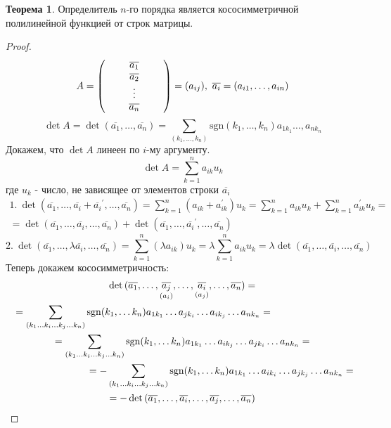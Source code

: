 \documentclass[a4paper, 12pt]{article}
\newcommand\tab[1][.5cm]{\hspace*{#1}}
\newcounter{thcount}
\theoremstyle{definition}
\newtheorem{theoremnum}[thcount]{Теорема}
\begin{document}
  \begin{theoremnum}
    Определитель $n$-го порядка является кососимметричной полилинейной функцией от строк матрицы.    
  \end{theoremnum} 
  \begin{proof}
    $$A=\begin{pmatrix}
      \tab & \overline{a_1} & \tab\\
      \null & \overline{a_2} & \null\\
      \null & \vdots & \null\\
      \null & \overline{a_n} & \null
    \end{pmatrix}=(a_{ij}),\ \overline{a_i}=(a_{i1},\dots, a_{in})$$
    $$\det{A}=\det{(\overline{a_1},\dots, \overline{a_n})}=\sum\limits_{(k_1,\dots, k_n)}\textrm{sgn}(k_1,\dots, k_n)a_{1k_1}\dots, a_{nk_n}$$
    Докажем, что $\det{A}$ линеен по $i$-му аргументу.
    $$\det{A}=\sum\limits_{k=1}^na_{ik}u_k$$
    где $u_k$ - число, не зависящее от элементов строки $\overline{a_i}$
    \begin{multline*}
      1.\ \det(\overline{a_1},\dots,\overline{a_i}+{\overline{a_i}}^{\prime},\dots, \overline{a_n})=\sum\limits_{k=1}^n(a_{ik}+a_{ik}^{\prime})u_k=\sum\limits_{k=1}^na_{ik}u_k+\sum\limits_{k=1}^na_{ik}^{\prime}u_k=\\=\det{(\overline{a_1},\dots,\overline{a_i},\dots, \overline{a_n})}+\det{(\overline{a_1},\dots,\overline{a_i}^{\prime},\dots, \overline{a_n})}
    \end{multline*}
    $$2.\ \det{(\overline{a_1},\dots,\lambda\overline{a_i},\dots, \overline{a_n})}=\sum\limits_{k=1}^n(\lambda a_{ik})u_k=\lambda\sum\limits_{k=1}^na_{ik}u_k=\lambda\det{(\overline{a_1},\dots,\overline{a_i},\dots, \overline{a_n})}$$
    Теперь докажем кососимметричность:
    \begin{multline*}
    \det{(\overline{a_1},\dots,\underset{(a_i)}{\overline{a_j}},\dots,\underset{(a_j)}{\overline{a_i}},\dots,\overline{a_n})}=\\ \tab[-2.8cm]=\sum\limits_{(k_1\dots k_i\dots k_j\dots k_n)}\textrm{sgn}(k_1,\dots k_n)a_{1k_1}\dots a_{jk_i}\dots a_{ik_j}\dots a_{nk_n}=\\=\sum\limits_{(k_1\dots k_i\dots k_j\dots k_n)}\textrm{sgn}(k_1,\dots k_n)a_{1k_1}\dots a_{ik_j}\dots a_{jk_i}\dots a_{nk_n}=\\=-\sum\limits_{(k_1\dots k_i\dots k_j\dots k_n)}\textrm{sgn}(k_1,\dots k_n)a_{1k_1}\dots a_{ik_i}\dots a_{jk_j}\dots a_{nk_n}=\tab[-2.8cm]\\=-\det{(\overline{a_1},\dots,\overline{a_i},\dots,\overline{a_j},\dots,\overline{a_n})}
    \end{multline*}
  \end{proof} 
\end{document}
